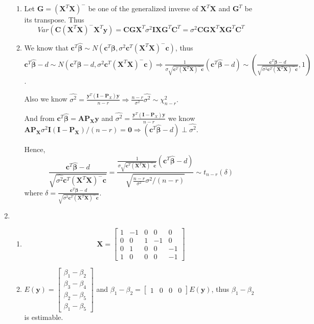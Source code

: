 \documentclass{article}
\begin{document}
\begin{enumerate}[leftmargin = 0 em, label = \arabic*., font = \bfseries]
\begin{enumerate}
		\item 
		Let $\bm G = (\bm X^T \bm X)^-$ be one of the generalized inverse of $\bm X^T \bm X$ and $\bm G^T$ be its transpose. Thus
		\[Var(\bm C (\bm X^T \bm X)^- \bm X^T \bm y) = \bm C \bm G \bm X^T \sigma^2 \bm I \bm X \bm G^T \bm C^T = \sigma^2 \bm C \bm G \bm X^T\bm X \bm G^T \bm C^T\]


		\item 
		We know that $\bm c^T \bm \hat{\bm \beta} \sim N(\bm c^T \bm \beta, \sigma^2 \bm c^T (\bm X^T \bm X)^- \bm c)$, thus $\bm c^T \bm \hat{\bm \beta} - d \sim N(\bm c^T \bm \beta - d, \sigma^2 \bm c^T (\bm X^T \bm X)^- \bm c) \Rightarrow \frac{1}{\sigma \sqrt{\bm c^T (\bm X^T \bm X)^- \bm c}} (\bm c^T \bm \hat{\bm \beta} - d) \sim (\frac{\bm c^T \bm \beta -d}{\sqrt{\sigma^2 \bm c^T (\bm X^T \bm X)^- \bm c}}, 1)$.

		Also we know $\hat{\sigma^2} = \frac{\bm y^T (\bm I - \bm P_{X}) \bm y}{n-r} \Rightarrow \frac{n-r}{\sigma^2} \hat{\sigma^2}  \sim \chi_{n-r}^2.$ 

		And from $\bm c^T \hat{\bm \beta} = \bm A \bm P_{\bm X} \bm y$ and $\hat{\sigma^2} = \frac{\bm y^T (\bm I - \bm P_{X})\bm y}{n-r}$ we know $\bm A \bm P_{\bm X} \sigma^2 \bm I (\bm I - \bm P_{\bm X})/(n-r) = \bm 0 \Rightarrow (\bm c^T \hat{\bm \beta} - d ) \perp \hat{\sigma^2} $.

		Hence, 
		\[\frac{\bm c^T \hat{\bm \beta} - d}{\sqrt{\hat{\sigma^2}\bm c^T (\bm X^T \bm X)^-\bm c}}=\frac{\frac{1}{\sigma \sqrt{\bm c^T (\bm X^T \bm X)^- \bm c}} (\bm c^T \bm \hat{\bm \beta} - d)}{\sqrt{\frac{n-r}{\sigma^2} \hat{\sigma^2}/(n-r)}} \sim t_{n-r}(\delta)\]
		where $\delta = \frac{\bm c^T \bm \beta -d}{\sqrt{\sigma^2 \bm c^T (\bm X^T \bm X)^- \bm c}}$.

		

	\end{enumerate}

	\item 
	\begin{enumerate}
		\item
	
	\[\bm X = \begin{bmatrix}
		1 & -1 & 0 & 0& 0\\
		0 & 0 & 1 & -1 & 0\\
		0 & 1 & 0 & 0& -1\\
		1 & 0 & 0 & 0& -1
	\end{bmatrix}\]


	\item 
	$E(\bm y) = \begin{bmatrix}
		\beta_1 - \beta_2\\
		\beta_3 - \beta_4\\
		\beta_2 - \beta_5\\
		\beta_1 - \beta_5
	\end{bmatrix}$ and $\beta_1 - \beta_2 = \begin{bmatrix}
		1 & 0 & 0 & 0
	\end{bmatrix}E(\bm y)$, thus $\beta_1 - \beta_2$ is estimable.



\end{enumerate}
\end{enumerate}
\end{document}
